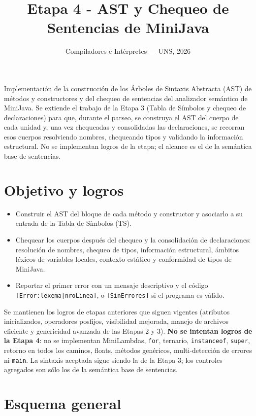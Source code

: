 \documentclass[11pt,a4paper]{article}
\title{Etapa 4 - AST y Chequeo de Sentencias de MiniJava}
\author{Compiladores e Intérpretes --- UNS, 2026}
\date{}
\begin{document}
\sloppy

\maketitle

\noindent
Implementación de la construcción de los Árboles de Sintaxis Abstracta (AST) de
métodos y constructores y del chequeo de sentencias del analizador semántico de
MiniJava. Se extiende el trabajo de la Etapa 3 (Tabla de Símbolos y chequeo de
declaraciones) para que, durante el parseo, se construya el AST del cuerpo de cada
unidad y, una vez chequeadas y consolidadas las declaraciones, se recorran esos
cuerpos resolviendo nombres, chequeando tipos y validando la información
estructural. No se implementan logros de la etapa; el alcance es el de la
semántica base de sentencias.

\section{Objetivo y logros}

\begin{itemize}
  \item Construir el AST del bloque de cada método y constructor y asociarlo a su
        entrada de la Tabla de Símbolos (TS).
  \item Chequear los cuerpos después del chequeo y la consolidación de
        declaraciones: resolución de nombres, chequeo de tipos, información
        estructural, ámbitos léxicos de variables locales, contexto estático y
        conformidad de tipos de MiniJava.
  \item Reportar el primer error con un mensaje descriptivo y el código
        \texttt{[Error:lexema|nroLinea]}, o \texttt{[SinErrores]} si el programa
        es válido.
\end{itemize}

Se mantienen los logros de etapas anteriores que siguen vigentes (atributos
inicializados, operadores posfijos, visibilidad mejorada, manejo de archivos
eficiente y genericidad avanzada de las Etapas 2 y 3). \textbf{No se intentan
logros de la Etapa 4}: no se implementan MiniLambdas, \texttt{for}, ternario,
\texttt{instanceof}, \texttt{super}, retorno en todos los caminos, floats,
métodos genéricos, multi-detección de errores ni \texttt{main}. La sintaxis
aceptada sigue siendo la de la Etapa 3; los controles agregados son sólo los de
la semántica base de sentencias.

\section{Esquema general}
\end{document}
